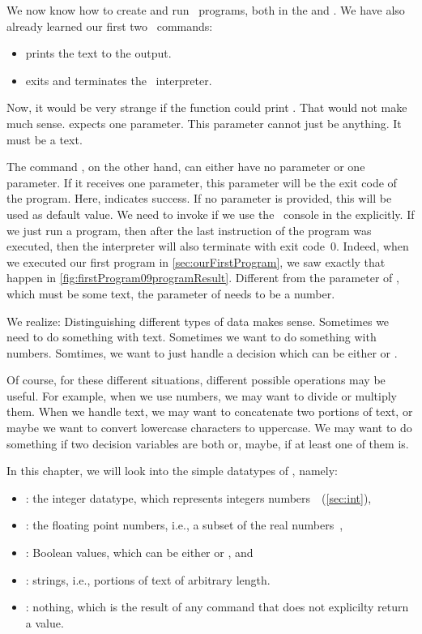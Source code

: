 %
%
We now know how to create and run \python\ programs, both in the  and .
We have also already learned our first two \python\ commands:%
%
\begin{itemize}%
\item {} prints the text  to the output.
\item {} exits and terminates the \python\ interpreter.%
\end{itemize}%
%
Now, it would be very strange if the  function could print .
That would not make much sense.
 expects one parameter.
This parameter cannot just be anything.
It must be a text.

The command , on the other hand, can either have no parameter or one parameter.
If it receives one parameter, this parameter will be the exit code of the program.
Here,  indicates success.
If no parameter is provided, this will be used as default value.
We need to invoke  if we use the \python\ console in the  explicitly.
If we just run a program, then after the last instruction of the program was executed, then the interpreter will also terminate with exit code~0.
Indeed, when we executed our first program in \cref{sec:ourFirstProgram}, we saw exactly that happen in \cref{fig:firstProgram09programResult}.
Different from the parameter of , which must be some text, the parameter of  needs to be a number.

We realize:
Distinguishing different types of data makes sense.
Sometimes we need to do something with text.
Sometimes we want to do something with numbers.
Somtimes, we want to just handle a decision which can be either  or .

Of course, for these different situations, different possible operations may be useful.
For example, when we use numbers, we may want to divide or multiply them.
When we handle text, we may want to concatenate two portions of text, or maybe we want to convert lowercase characters to uppercase.
We may want to do something if two decision variables are both  or, maybe, if at least one of them is.

In this chapter, we will look into the simple datatypes of \python, namely:%
%
\begin{itemize}%
%
\item {}: the integer datatype, which represents integers numbers~\integerNumbers~(\cref{sec:int}),%
\item {}: the floating point numbers, i.e., a subset of the real numbers~\realNumbers,%
\item {}: Boolean values, which can be either  or , and%
\item {}: strings, i.e., portions of text of arbitrary length.%
\item {}: nothing, which is the result of any command that does not explicilty return a value.%
%
\end{itemize}%
%
\endhsection%
%
